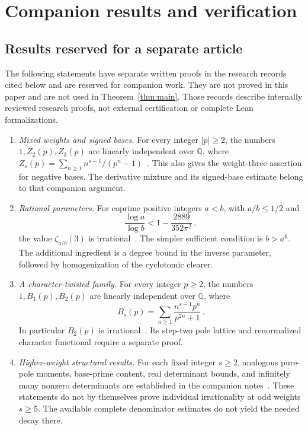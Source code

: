 \documentclass[11pt,letterpaper]{article}
\numberwithin{equation}{section}
\theoremstyle{remark}
\newcommand{\Q}{\mathbb Q}
\begin{document}
\section{Companion results and verification}

\subsection{Results reserved for a separate article}

The following statements have separate written proofs in the research records cited below and are reserved for companion work. They are not proved in this paper and are not used in Theorem~\ref{thm:main}. Those records describe internally reviewed research proofs, not external certification or complete Lean formalizations.

\begin{enumerate}
\item \emph{Mixed weights and signed bases.} For every integer $|p|\ge2$, the numbers $1,Z_2(p),Z_3(p)$ are linearly independent over $\Q$, where $Z_s(p)=\sum_{n\ge1}n^{s-1}/(p^n-1)$~\cite{CompanionMixed}. This also gives the weight-three assertion for negative bases. The derivative mixture and its signed-base estimate belong to that companion argument.
\item \emph{Rational parameters.} For coprime positive integers $a<b$, with $a/b\le1/2$ and
\begin{equation*}
 \frac{\log a}{\log b}<1-\frac{2889}{352\pi^2}\,,
\end{equation*}
the value $\zeta_{a/b}(3)$ is irrational~\cite{CompanionRational}. The simpler sufficient condition is $b>a^6$. The additional ingredient is a degree bound in the inverse parameter, followed by homogenization of the cyclotomic clearer.
\item \emph{A character-twisted family.} For every integer $p\ge2$, the numbers $1,B_1(p),B_2(p)$ are linearly independent over $\Q$, where
\begin{equation*}
 B_s(p)=\sum_{n\ge1}\frac{n^{s-1}p^n}{p^{2n}+1}\,.
\end{equation*}
In particular $B_2(p)$ is irrational~\cite{CompanionBeta}. Its step-two pole lattice and renormalized character functional require a separate proof.
\item \emph{Higher-weight structural results.} For each fixed integer $s\ge2$, analogous pure-pole moments, base-prime content, real determinant bounds, and infinitely many nonzero determinants are established in the companion notes~\cite{CompanionMixed}. These statements do not by themselves prove individual irrationality at odd weights $s\ge5$. The available complete denominator estimates do not yield the needed decay there.
\end{enumerate}
\end{document}
